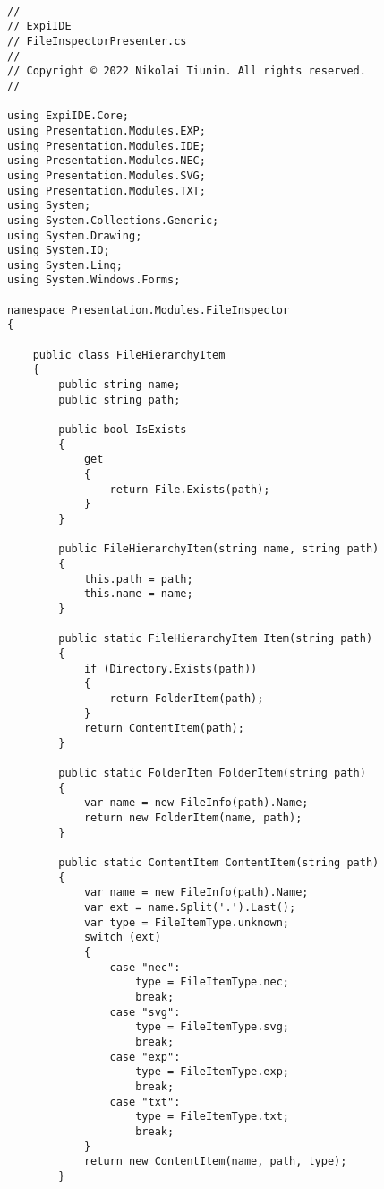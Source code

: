 \documentclass{scrartcl}
\begin{document}
\begin{lstlisting}[language={[Sharp]C}, caption={IDE}, label={experiment}]

//
// ExpiIDE
// FileInspectorPresenter.cs
//
// Copyright © 2022 Nikolai Tiunin. All rights reserved.
//

using ExpiIDE.Core;
using Presentation.Modules.EXP;
using Presentation.Modules.IDE;
using Presentation.Modules.NEC;
using Presentation.Modules.SVG;
using Presentation.Modules.TXT;
using System;
using System.Collections.Generic;
using System.Drawing;
using System.IO;
using System.Linq;
using System.Windows.Forms;

namespace Presentation.Modules.FileInspector
{

    public class FileHierarchyItem
    {
        public string name;
        public string path;

        public bool IsExists
        {
            get
            {
                return File.Exists(path);
            }
        }

        public FileHierarchyItem(string name, string path)
        {
            this.path = path;
            this.name = name;
        }

        public static FileHierarchyItem Item(string path)
        {
            if (Directory.Exists(path))
            {
                return FolderItem(path);
            }
            return ContentItem(path);
        }

        public static FolderItem FolderItem(string path)
        {
            var name = new FileInfo(path).Name;
            return new FolderItem(name, path);
        }

        public static ContentItem ContentItem(string path)
        {
            var name = new FileInfo(path).Name;
            var ext = name.Split('.').Last();
            var type = FileItemType.unknown;
            switch (ext)
            {
                case "nec":
                    type = FileItemType.nec;
                    break;
                case "svg":
                    type = FileItemType.svg;
                    break;
                case "exp":
                    type = FileItemType.exp;
                    break;
                case "txt":
                    type = FileItemType.txt;
                    break;
            }
            return new ContentItem(name, path, type);
        }


\end{lstlisting}
\end{document}
